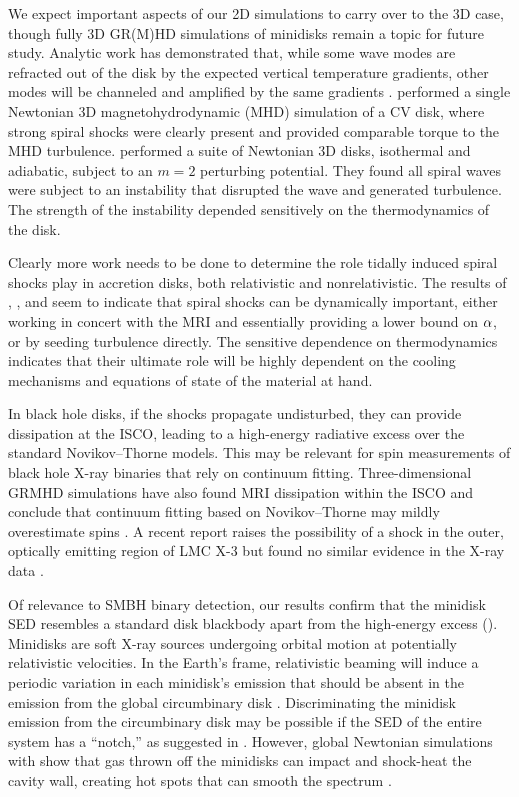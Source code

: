 We expect important aspects of our 2D simulations to carry over to the 3D case, though fully 3D GR(M)HD simulations of minidisks remain a topic for future study.  Analytic work has demonstrated that, while some wave modes are refracted out of the disk by the expected vertical temperature gradients, other modes will be channeled and amplified by the same gradients \citep{Lubow98}. \cite{Ju16} performed a single Newtonian 3D magnetohydrodynamic (MHD) simulation of a CV disk, where strong spiral shocks were clearly present and provided comparable torque to the MHD turbulence.  \cite{Bae16} performed a suite of Newtonian 3D disks, isothermal and adiabatic, subject to an $m=2$ perturbing potential.  They found all spiral waves were subject to an instability that disrupted the wave and generated turbulence.  The strength of the instability depended sensitively on the thermodynamics of the disk.

Clearly more work needs to be done to determine the role tidally induced spiral shocks play in accretion disks, both relativistic and nonrelativistic.  The results of \cite{Ju16}, \cite{Zhu16}, and \cite{Bae16} seem to indicate that spiral shocks can be dynamically important, either working in concert with the MRI and essentially providing a lower bound on $\alpha$, or by seeding turbulence directly.  The sensitive dependence on thermodynamics indicates that their ultimate role will be highly dependent on the cooling mechanisms and equations of state of the material at hand.

In black hole disks, if the shocks propagate undisturbed, they can provide dissipation at the ISCO, leading to a high-energy radiative excess over the standard Novikov--Thorne models.  This may be relevant for spin measurements of black hole X-ray binaries that rely on continuum fitting. Three-dimensional GRMHD simulations have also found MRI dissipation within the ISCO and conclude that continuum fitting based on Novikov--Thorne may mildly overestimate spins \citep{Penna10, Noble10, Kulkarni11, Schnittman15}.  A recent report raises the possibility of a shock in the outer, optically emitting region of LMC X-3 but found no similar evidence in the X-ray data \citep{Steiner14}.

Of relevance to SMBH binary detection, our results confirm that the minidisk SED resembles a standard disk blackbody apart from the high-energy excess ().  Minidisks are soft X-ray sources undergoing orbital motion at potentially relativistic velocities.  In the Earth's frame, relativistic beaming will induce a periodic variation in each minidisk's emission that should be absent in the emission from the global circumbinary disk \citep{DOrazio15}.  Discriminating the minidisk emission from the circumbinary disk may be possible if the SED of the entire system has a ``notch,'' as suggested in \cite{Roedig14}.  However, global Newtonian simulations with \Disco{} show that gas thrown off the minidisks can impact and shock-heat the cavity wall, creating hot spots that can smooth the spectrum \citep{Farris15A}.

